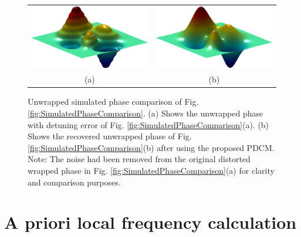 \begin{figure}[Ht]
  \begin{center}
    \begin{tabular}{ c c }
     
\includegraphics[width=.47\columnwidth]{Chpt4_figures/FaseError_Ideal_3D.eps}&
      \includegraphics[width=.47\columnwidth]{Chpt4_figures/Fase_Ideal_3D.eps}\\
      (a) &  (b)\\
    \end{tabular}
  \end{center}
  \caption{Unwrapped simulated phase comparison of Fig. 
  \ref{fig:SimulatedPhaseComparison}. (a) Shows the 
  unwrapped phase with detuning error of Fig.
  \ref{fig:SimulatedPhaseComparison}(a). (b) Shows the recovered unwrapped 
  phase of Fig. \ref{fig:SimulatedPhaseComparison}(b) after using the proposed 
  PDCM. Note:  The noise had been removed from the original distorted wrapped
  phase in Fig. \ref{fig:SimulatedPhaseComparison}(a) for clarity and
  comparison purposes.}
  \label{fig:SimulatedPhase3D}
\end{figure}

\section{A priori local frequency calculation}

